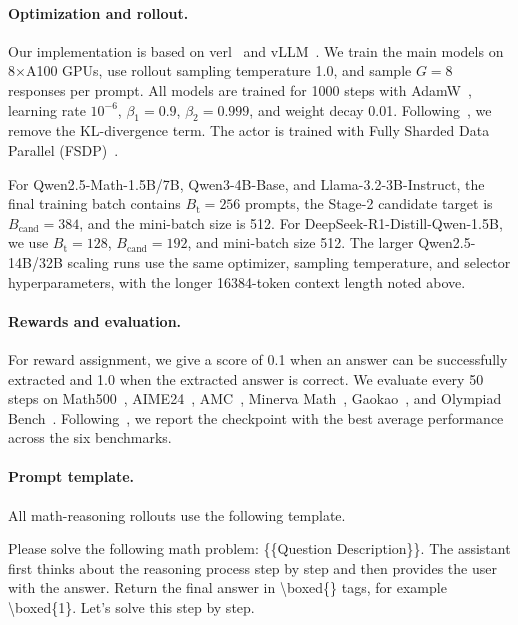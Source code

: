 \paragraph{Optimization and rollout.}
Our implementation is based on verl~\cite{verl2025} and vLLM~\cite{vLLM2023SOSP}. We train the main models on 8$\times$A100 GPUs, use rollout sampling temperature 1.0, and sample $G=8$ responses per prompt. All models are trained for 1000 steps with AdamW~\cite{loshchilov2018decoupled}, learning rate $10^{-6}$, $\beta_1=0.9$, $\beta_2=0.999$, and weight decay 0.01. Following~\citet{yu2025dapo}, we remove the KL-divergence term. The actor is trained with Fully Sharded Data Parallel (FSDP)~\citep{zhao2023pytorch}.

For Qwen2.5-Math-1.5B/7B, Qwen3-4B-Base, and Llama-3.2-3B-Instruct, the final training batch contains $B_{\mathrm{t}}=256$ prompts, the Stage-2 candidate target is $B_{\mathrm{cand}}=384$, and the mini-batch size is 512. For DeepSeek-R1-Distill-Qwen-1.5B, we use $B_{\mathrm{t}}=128$, $B_{\mathrm{cand}}=192$, and mini-batch size 512. The larger Qwen2.5-14B/32B scaling runs use the same optimizer, sampling temperature, and selector hyperparameters, with the longer 16384-token context length noted above.

\paragraph{Rewards and evaluation.}
For reward assignment, we give a score of 0.1 when an answer can be successfully extracted and 1.0 when the extracted answer is correct. We evaluate every 50 steps on Math500~\cite{hendrycks2021measuringmathematicalproblemsolving}, AIME24~\cite{aops2024aime}, AMC~\cite{aops2024amc}, Minerva Math~\cite{NEURIPS2022_18abbeef}, Gaokao~\cite{zhang2024gaokao}, and Olympiad Bench~\cite{he-etal-2024-olympiadbench}. Following~\citet{zheng2025act}, we report the checkpoint with the best average performance across the six benchmarks.

\paragraph{Prompt template.}
All math-reasoning rollouts use the following template.

\begin{tcolorbox}[myexample={Question Template}]
Please solve the following math problem: \{\{Question Description\}\}. The assistant first thinks about the reasoning process step by step and then provides the user with the answer. Return the final answer in \textbackslash boxed\{\} tags, for example \textbackslash boxed\{1\}. Let's solve this step by step.
\end{tcolorbox}

